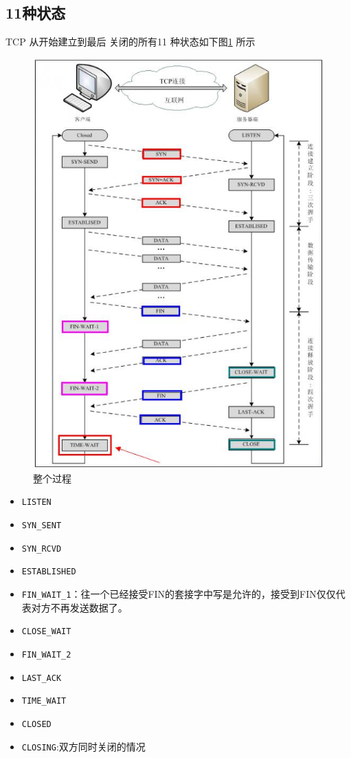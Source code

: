\documentclass[UTF8,a4paper,8pt]{ctexbook}
\begin{document}
		\subsection{11种状态}
			TCP 从开始建立到最后 关闭的所有11 种状态如下图\ref{allstatus} 所示
			\begin{figure}[ht]
				\centering
				\includegraphics[scale = 0.5]{TCP-status.jpg}
				\caption{整个过程}
				\label{allstatus}
			\end{figure}
			
			\newpage		
			\begin{itemize}
				\item \verb|LISTEN|
				\item \verb|SYN_SENT|
				\item \verb|SYN_RCVD|
				\item \verb|ESTABLISHED|
				\item \verb|FIN_WAIT_1|：往一个已经接受FIN的套接字中写是允许的，接受到FIN仅仅代表对方不再发送数据了。
				\item \verb|CLOSE_WAIT|
				\item \verb|FIN_WAIT_2|
				\item \verb|LAST_ACK|
				\item \verb|TIME_WAIT|
				\item \verb|CLOSED|
				\item \verb|CLOSING|:双方同时关闭的情况
			\end{itemize}
\end{document}
